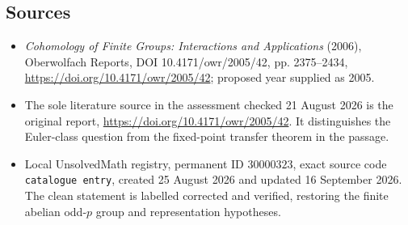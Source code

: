 \documentclass[11pt]{article}
\begin{document}
\subsection{Sources}
\begin{itemize}
\item \emph{Cohomology of Finite Groups: Interactions and Applications} (2006), Oberwolfach Reports, DOI 10.4171/owr/2005/42, pp. 2375--2434, \url{https://doi.org/10.4171/owr/2005/42}; proposed year supplied as 2005.
\item The sole literature source in the assessment checked 21 August 2026 is the original report, \url{https://doi.org/10.4171/owr/2005/42}. It distinguishes the Euler-class question from the fixed-point transfer theorem in the passage.
\item Local UnsolvedMath registry, permanent ID $30000323$, exact source code \texttt{catalogue entry}, created 25 August 2026 and updated 16 September 2026. The clean statement is labelled corrected and verified, restoring the finite abelian odd-$p$ group and representation hypotheses.
\end{itemize}
\end{document}

